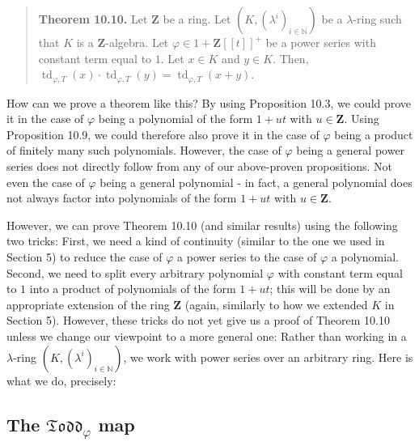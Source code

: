 \documentclass[numbers=enddot,12pt,final,onecolumn,notitlepage]{scrartcl}%
\begin{document}
\begin{quote}
\textbf{Theorem 10.10.} Let $\mathbf{Z}$ be a ring. Let $\left(  K,\left(
\lambda^{i}\right)  _{i\in\mathbb{N}}\right)  $ be a $\lambda$-ring such that
$K$ is a $\mathbf{Z}$-algebra. Let $\varphi\in1+\mathbf{Z}\left[  \left[
t\right]  \right]  ^{+}$ be a power series with constant term equal to $1$.
Let $x\in K$ and $y\in K$. Then, $\operatorname*{td}\nolimits_{\varphi
,T}\left(  x\right)  \cdot\operatorname*{td}\nolimits_{\varphi,T}\left(
y\right)  =\operatorname*{td}\nolimits_{\varphi,T}\left(  x+y\right)  $.
\end{quote}

How can we prove a theorem like this? By using Proposition 10.3, we could
prove it in the case of $\varphi$ being a polynomial of the form $1+ut$ with
$u\in\mathbf{Z}$. Using Proposition 10.9, we could therefore also prove it in
the case of $\varphi$ being a product of finitely many such polynomials.
However, the case of $\varphi$ being a general power series does not directly
follow from any of our above-proven propositions. Not even the case of
$\varphi$ being a general polynomial - in fact, a general polynomial does not
always factor into polynomials of the form $1+ut$ with $u\in\mathbf{Z}$.

However, we can prove Theorem 10.10 (and similar results) using the following
two tricks: First, we need a kind of continuity (similar to the one we used in
Section 5) to reduce the case of $\varphi$ a power series to the case of
$\varphi$ a polynomial. Second, we need to split every arbitrary polynomial
$\varphi$ with constant term equal to $1$ into a product of polynomials of the
form $1+ut$; this will be done by an appropriate extension of the ring
$\mathbf{Z}$ (again, similarly to how we extended $K$ in Section 5). However,
these tricks do not yet give us a proof of Theorem 10.10 unless we change our
viewpoint to a more general one: Rather than working in a $\lambda$-ring
$\left(  K,\left(  \lambda^{i}\right)  _{i\in\mathbb{N}}\right)  $, we work
with power series over an arbitrary ring. Here is what we do, precisely:

\subsection{The $\mathfrak{Todd}_{\varphi}$ map}
\end{document}
